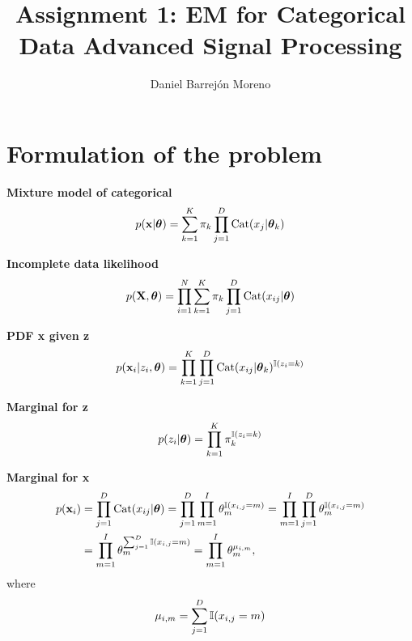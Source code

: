 \documentclass[12pt]{article}
\begin{document}
 
 
 
\title{Assignment 1: EM for Categorical Data Advanced Signal Processing}%
\author{Daniel Barrejón Moreno} %
 
\maketitle
 
\section*{Formulation of the problem}
 
\textbf{ Mixture model of categorical} \begin{equation}
     p(\mathbf{x}|\boldsymbol\theta) = \sum_{k=1}^{K}\pi_k\prod_{j=1}^{D}\operatorname{\mathrm{Cat}}(x_j|\boldsymbol\theta_k)
 \end{equation}

\textbf{Incomplete data likelihood}
\begin{equation}
    p(\mathbf{X},\boldsymbol\theta) = \prod_{i=1}^{N}\sum_{k=1}^{K}\pi_k\prod_{j=1}^{D}\operatorname{\mathrm{Cat}}(x_{ij}|\boldsymbol\theta)
\end{equation}

\textbf{PDF x given z}
\begin{equation}
p(\mathbf{x}_i|z_i,\boldsymbol\theta) = \prod_{k=1}^{K}\prod_{j=1}^{D}\operatorname{\mathrm{Cat}}(x_{ij}|\boldsymbol\theta_k)^{\mathbb{I} (z_i=k)}
\end{equation}

\textbf{Marginal for z}
\begin{equation}
    p(z_i|\boldsymbol\theta) = \prod_{k=1}^{K}\pi_k^{\mathbb{I} (z_i=k)}
\end{equation}

\textbf{Marginal for x}
\begin{align}
    p(\mathbf{x}_i) & = \prod_{j=1}^D\operatorname{\mathrm{Cat}}(x_{ij}|\boldsymbol\theta) = \prod_{j=1}^D\prod_{m=1}^I\theta_m^{\mathbb{I}(x_{i,j}=m)} = \prod_{m=1}^I\prod_{j=1}^D\theta_m^{\mathbb{I}(x_{i,j}=m)} \\
    & = \prod_{m=1}^I\theta_m^{\sum_{j=1}^D {\mathbb{I}(x_{i,j}=m)}} = \prod_{m=1}^I \theta_m^{\mu_{i,m}},
\end{align}
where
\begin{equation}
    \mu_{i,m} = \sum_{j=1}^D {\mathbb{I}(x_{i,j}=m)}
\end{equation}
\end{document}
